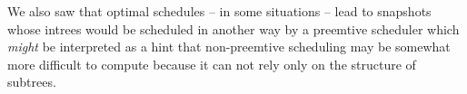 We also saw that optimal schedules -- in some situations -- lead to snapshots whose intrees would be scheduled in another way by a preemtive scheduler which \emph{might} be interpreted as a hint that non-preemtive scheduling may be somewhat more difficult to compute because it can not rely only on the structure of subtrees.

